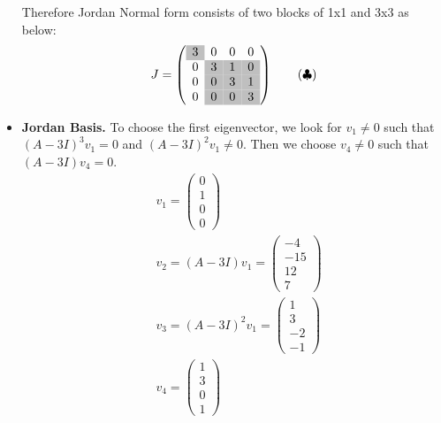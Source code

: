 \documentclass[12pt, letterpaper]{scrartcl}
\begin{document}
\begin{itemize}
    Therefore Jordan Normal form consists of two blocks of 1x1 and 3x3 as below:
    \begin{align*}
     J=\left(
     \begin{array}{cccc}
          \cellcolor{lightgray}3&0&0&0\\
          0&\cellcolor{lightgray}3&\cellcolor{lightgray}1&\cellcolor{lightgray}0\\
          0&\cellcolor{lightgray}0&\cellcolor{lightgray}3&\cellcolor{lightgray}1\\
          0&\cellcolor{lightgray}0&\cellcolor{lightgray}0&\cellcolor{lightgray}3
     \end{array}
     \right)
     \tag{$\clubsuit$}
     \label{jordan}
     \end{align*}
    \item \textbf{Jordan Basis.} To choose the first eigenvector, we look for $v_1\neq0$ such that $(A-3I)^3v_1=0$ and $(A-3I)^2v_1\neq0$.
    Then we choose $v_4\neq0$ such that $(A-3I)v_4=0$.
    \begin{align*}
        &v_1
        =
        \left(
        \begin{array}{c}
          0\\
          1\\
          0\\
          0
        \end{array}
        \right)\\
        &v_2=(A-3I)v_1=\left(
        \begin{array}{c}
          -4\\
          -15\\
          12\\
          7
        \end{array}
        \right)\\
        &v_3=(A-3I)^2v_1=\left(
        \begin{array}{c}
          1\\
          3\\
          -2\\
          -1
        \end{array}
        \right)\\
        &v_4=\left(
        \begin{array}{c}
          1\\
          3\\
          0\\
          1
        \end{array}
        \right)\\

\end{align*}
\end{itemize}
\end{document}
